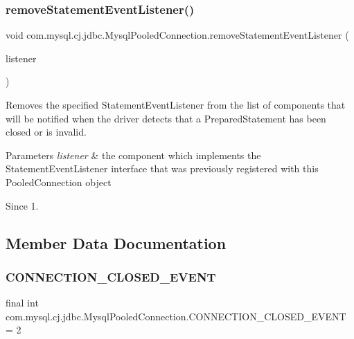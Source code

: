 \subsubsection{\texorpdfstring{remove\+Statement\+Event\+Listener()}{removeStatementEventListener()}}
{\footnotesize\ttfamily void com.\+mysql.\+cj.\+jdbc.\+Mysql\+Pooled\+Connection.\+remove\+Statement\+Event\+Listener (\begin{DoxyParamCaption}\item[{Statement\+Event\+Listener}]{listener }\end{DoxyParamCaption})}

Removes the specified {\ttfamily Statement\+Event\+Listener} from the list of components that will be notified when the driver detects that a {\ttfamily Prepared\+Statement} has been closed or is invalid.


\begin{DoxyParams}{Parameters}
{\em listener} & the component which implements the {\ttfamily Statement\+Event\+Listener} interface that was previously registered with this {\ttfamily Pooled\+Connection} object\\
\hline
\end{DoxyParams}
\begin{DoxySince}{Since}
1. 
\end{DoxySince}


\subsection{Member Data Documentation}
\mbox{\label{classcom_1_1mysql_1_1cj_1_1jdbc_1_1_mysql_pooled_connection_a0d53e8b5f1ba1fb67bf1f46adfd2dd3f}} 
\subsubsection{\texorpdfstring{C\+O\+N\+N\+E\+C\+T\+I\+O\+N\+\_\+\+C\+L\+O\+S\+E\+D\+\_\+\+E\+V\+E\+NT}{CONNECTION\_CLOSED\_EVENT}}
{\footnotesize\ttfamily final int com.\+mysql.\+cj.\+jdbc.\+Mysql\+Pooled\+Connection.\+C\+O\+N\+N\+E\+C\+T\+I\+O\+N\+\_\+\+C\+L\+O\+S\+E\+D\+\_\+\+E\+V\+E\+NT = 2\hspace{0.3cm}{\ttfamily [static]}}

